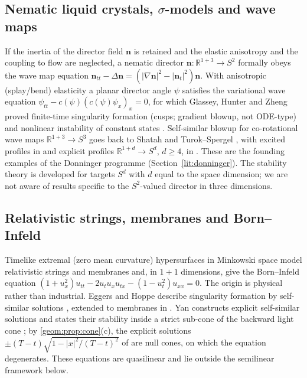 \subsection{Nematic liquid crystals, \texorpdfstring{$\sigma$}{sigma}-models and wave maps}
\label{lit:lc}
If the inertia of the director field $\boldsymbol n$ is retained and the
elastic anisotropy and the coupling to flow are neglected, a nematic
director $\boldsymbol n:\mathbb{R}^{1+3}\to S^2$ formally obeys the wave
map equation $\boldsymbol n_{tt}-\Delta\boldsymbol n=(|\nabla\boldsymbol
n|^2-|\boldsymbol n_t|^2)\boldsymbol n$. With anisotropic (splay/bend)
elasticity a planar director angle $\psi$ satisfies the variational wave
equation $\psi_{tt}-c(\psi)(c(\psi)\psi_x)_x=0$, for which Glassey, Hunter
and Zheng proved finite-time singularity formation (cusps; gradient
blowup, not ODE-type) and nonlinear instability of constant states
\cite{GlasseyHunterZheng1996}. Self-similar blowup for co-rotational wave
maps $\mathbb{R}^{1+3}\to S^3$ goes back to Shatah \cite{Shatah1988} and
Turok--Spergel \cite{TurokSpergel1990}, with excited profiles in
\cite{Bizon2000} and explicit profiles $\mathbb{R}^{1+d}\to S^d$, $d\ge4$, in
\cite{BiernatBizon2015}. These are the founding examples of the Donninger
programme (Section~\ref{lit:donninger}). The stability theory is developed
for targets $S^d$ with $d$ equal to the space dimension; we are not aware of
results specific to the $S^2$-valued director in three dimensions.

\subsection{Relativistic strings, membranes and Born--Infeld}
\label{lit:membranes}
Timelike extremal (zero mean curvature) hypersurfaces in Minkowski space
model relativistic strings and membranes and, in $1+1$ dimensions, give
the Born--Infeld equation
$(1+u_x^2)u_{tt}-2u_tu_xu_{tx}-(1-u_t^2)u_{xx}=0$. The origin is physical
rather than industrial. Eggers and Hoppe describe singularity formation by
self-similar solutions \cite{EggersHoppe2009}, extended to membranes in
\cite{EggersEtAl2015}. Yan constructs explicit self-similar solutions and
states their stability inside a strict sub-cone of the backward light cone
\cite{Yan2019a,Yan2019b}; by \cref{geom:prop:cone}(c), the explicit
solutions $\pm(T-t)\sqrt{1-|x|^2/(T-t)^2}$ of \cite{Yan2019b} are null
cones, on which the equation degenerates. These equations are quasilinear and lie
outside the semilinear framework below.

